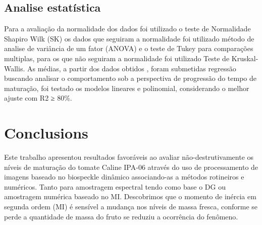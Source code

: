 \documentclass[journal,article,submit,moreauthors,pdftex,10pt,a4paper]{mdpi}
\theoremstyle{mdpi}
\newcounter{ex}
\newcounter{re}
\theoremstyle{mdpidefinition}
\begin{document}
\subsection{Analise estatística}

Para a avaliação da normalidade dos dados foi utilizado o teste de Normalidade Shapiro Wilk (SK) os dados que seguiram a normalidade foi utilizado método de analise de variância de um fator (ANOVA) e o teste de Tukey para comparações multiplas, para os que não seguiram a normalidade foi utilizado Teste de Kruskal-Wallis. As médias, a partir dos dados obtidos , foram submetidas regressão buscando analisar o comportamento sob a perspectiva de progressão do tempo de maturação, foi testado os modelos lineares e polinomial, considerando o melhor ajuste com R2 ≥ 80\%.


\section{Conclusions}

Este trabalho apresentou resultados favoráveis ao avaliar não-destrutivamente os níveis de maturação do tomate Caline IPA-06 através do uso de processamento de imagens baseado no biospeckle dinâmico associando-as a métodos rotineiros e numéricos. Tanto para amostragem espectral tendo como base o DG ou amostragem numérica baseado no MI. Descobrimos que o momento de inércia em segunda ordem (MI) é sensível a mudança nos níveis de massa fresca, conforme se perde a quantidade de massa do fruto se reduziu a ocorrência do fenômeno.

\end{document}
